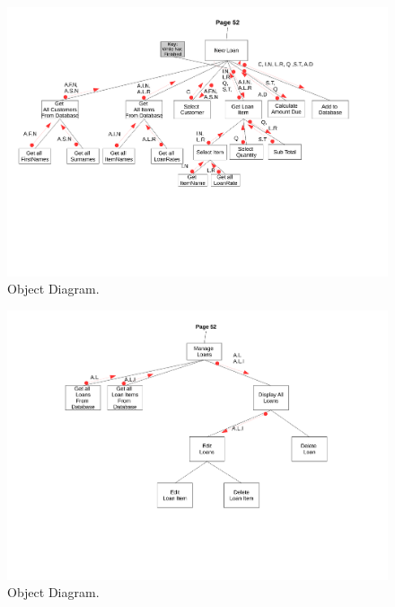\begin{landscape}
\newpage

\begin{figure}[H]
    \begin{center}
    \includegraphics[width=500px]{./Design/top_down_design/new_loan.pdf}
    \caption{Object Diagram.} \label{fig:object_diagram}
    \end{center}
\end{figure}

\newpage

\begin{figure}[H]
    \begin{center}
    \includegraphics[width=500px]{./Design/top_down_design/manage_loans.pdf}
    \caption{Object Diagram.} \label{fig:object_diagram}
    \end{center}
\end{figure}


\end{landscape}
